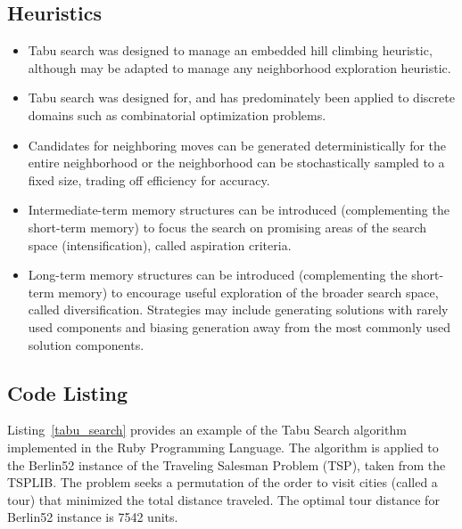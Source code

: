 \subsection{Heuristics}
\begin{itemize}
	\item Tabu search was designed to manage an embedded hill climbing heuristic, although may be adapted to manage any neighborhood exploration heuristic.
	\item Tabu search was designed for, and has predominately been applied to discrete domains such as combinatorial optimization problems.
	\item Candidates for neighboring moves can be generated deterministically for the entire neighborhood or the neighborhood can be stochastically sampled to a fixed size, trading off efficiency for accuracy. 
	\item Intermediate-term memory structures can be introduced (complementing the short-term memory) to focus the search on promising areas of the search space (intensification), called aspiration criteria.
	\item Long-term memory structures can be introduced (complementing the short-term memory) to encourage useful exploration of the broader search space, called diversification. Strategies may include generating solutions with rarely used components and biasing generation away from the most commonly used solution components.
\end{itemize}

\subsection{Code Listing}
Listing~\ref{tabu_search} provides an example of the Tabu Search algorithm implemented in the Ruby Programming Language. 
The algorithm is applied to the Berlin52 instance of the Traveling Salesman Problem (TSP), taken from the TSPLIB. The problem seeks a permutation of the order to visit cities (called a tour) that minimized the total distance traveled. The optimal tour distance for Berlin52 instance is 7542 units.

